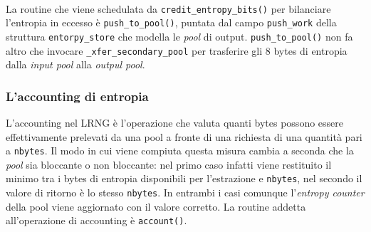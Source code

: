 \documentclass{article}
\begin{document}
 \paragraph{}La routine che viene schedulata da \verb+credit_entropy_bits()+ per
 bilanciare l'entropia in eccesso è \verb+push_to_pool()+, puntata
 dal campo \verb+push_work+ della struttura \verb+entorpy_store+ che modella le
 \emph{pool} di output. \verb+push_to_pool()+ non fa altro che invocare
 \verb+_xfer_secondary_pool+ per trasferire gli 8 bytes di entropia dalla
 \emph{input pool} alla \emph{outpul pool}.
 
 \subsubsection{L'accounting di entropia}\label{account}
 L'accounting nel LRNG è l'operazione che valuta quanti bytes possono essere
 effettivamente prelevati da una pool a fronte di una richiesta di
 una quantità pari a \verb+nbytes+.
 Il modo in cui viene compiuta questa misura cambia a seconda che la
 \emph{pool} sia bloccante o non bloccante: nel primo caso infatti viene
 restituito il minimo tra i bytes di entropia disponibili per l'estrazione e
 \verb+nbytes+, nel secondo il valore di ritorno è lo stesso \verb+nbytes+.
 In entrambi i casi comunque l'\emph{entropy counter} della pool viene
 aggiornato con il valore corretto. La routine addetta all'operazione di accounting è
 \verb+account()+.
 
\end{document}
